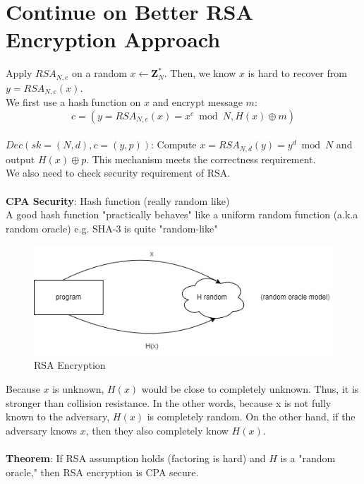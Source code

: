 \documentclass{scribe}
\begin{document}
\maketitle


\section{Continue on Better RSA Encryption Approach}
Apply $RSA_{N,e}$ on a random $x \leftarrow \mathbf{Z}_N^*$. Then, we know $x$ is hard to recover from $y=RSA_{N,e}(x)$.
\\
We first use a hash function on $x$ and encrypt message $m$:
\[c = (y=RSA_{N,e}(x) = x^e \bmod N, H(x) \oplus m)\]  
\\
$Dec(sk=(N,d), c=(y,p))$: Compute $x=RSA_{N,d}(y) = y ^d \bmod N$ and output $H(x) \oplus p$. This mechanism meets the correctness requirement.
\vspace{8mm}
\\
We also need to check security requirement of RSA.
\\\\
\textbf{CPA Security}: Hash function (really random like)
\\
A good hash function "practically behaves" like a uniform random function (a.k.a random oracle) e.g. SHA-3 is quite "random-like"
\\
\begin{figure}[H]
    \centering
    \includegraphics[scale=0.5]{rsa_encryption.jpg}
    \caption{RSA Encryption}
\end{figure}
\noindent Because $x$ is unknown, $H(x)$ would be close to completely unknown. Thus, it is stronger than collision resistance. In the other words, because x is not fully known to the adversary, $H(x)$ is completely random. On the other hand, if the adversary knows $x$, then they also completely know $H(x)$.
\\\\
\textbf{Theorem}: If RSA assumption holds (factoring is hard) and $H$ is a "random oracle," then RSA encryption is CPA secure. 
\vspace{10mm}
\end{document}
